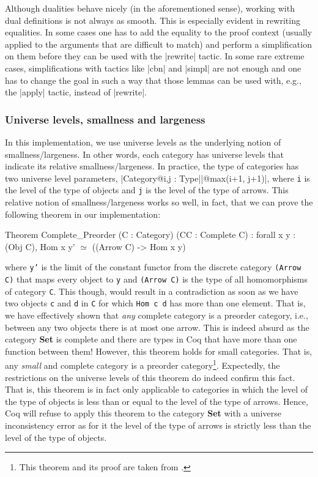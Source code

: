 \documentclass[9pt, twocolumn]{extarticle}
\begin{document}
Although dualities behave nicely (in the aforementioned sense), working with dual definitions is not always as smooth.
This is especially evident in rewriting equalities.
In some cases one has to add the equality to the proof context (usually applied to the arguments that are difficult to match) and perform a simplification on them before they can be used with the \Coqe|rewrite| tactic.
In some rare extreme cases, simplifications with tactics like \Coqe|cbn| and \Coqe|simpl| are not enough and one has to change the goal in such a way that those lemmas can be used with, e.g., the \Coqe|apply| tactic, instead of \Coqe|rewrite|.

\subsubsection*{Universe levels, smallness and largeness}
In this implementation, we use universe levels as the underlying notion of smallness/largeness.
In other words, each category has universe levels that indicate its relative smallness/largeness.
In practice, the type of categories has two universe level parameters, \Coqe|Category@{i,j} : Type|\Coqe|@{max(i+1, j+1)}|, where \texttt{i} is the level of the type of objects and \texttt{j} is the level of the type of arrows.
This relative notion of smallness/largeness works so well, in fact, that we can prove the following theorem in our implementation:
\begin{Coq}
Theorem Complete_Preorder (C : Category) (CC : Complete C) :
   forall x y : (Obj C), Hom x y' $\simeq$  ((Arrow C) -> Hom x y)
\end{Coq}
where \texttt{y'} is the limit of the constant functor from the discrete category \texttt{(Arrow C)} that maps every object to \texttt{y} and \texttt{(Arrow C)} is the type of all homomorphisms of category \texttt{C}.
This though, would result in a contradiction as soon as we have two objects \texttt{c} and \texttt{d} in \texttt{C} for which \texttt{Hom c d} has more than one element.
That is, we have effectively shown that \emph{any} complete category is a preorder category, i.e., between any two objects there is at most one arrow.
This is indeed absurd as the category \textbf{Set} is complete and there are types in Coq that have more than one function between them! 
However, this theorem holds for small categories.
That is, any \emph{small} and complete category is a preorder category\footnote{This theorem and its proof are taken from \cite{awodey2010category}.}.
Expectedly, the restrictions on the universe levels of this theorem do indeed confirm this fact.
That is, this theorem is in fact only applicable to categories in which the level of the type of objects is less than or equal to the level of the type of arrows.
Hence, Coq will refuse to apply this theorem to the category \textbf{Set} with a universe inconsistency error as for it the level of the type of arrows is strictly less than the level of the type of objects.
\end{document}
